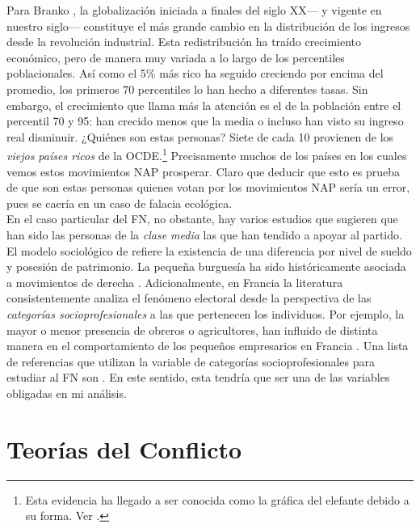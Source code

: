 Para Branko \textcite{Milanovic16}, la globalización iniciada a finales del siglo XX--- y vigente en nuestro siglo--- constituye el más grande cambio en la distribución de los ingresos desde la revolución industrial. Esta redistribución ha traído crecimiento económico, pero de manera muy variada a lo largo de los percentiles poblacionales. Así como el 5\% más rico ha seguido creciendo por encima del promedio, los primeros 70 percentiles lo han hecho a diferentes tasas. Sin embargo, el crecimiento que llama más la atención es el de la población entre el percentil 70 y 95: han crecido menos que la media o incluso han visto su ingreso real disminuir. ¿Quiénes son estas personas? Siete de cada 10 provienen de los \textit{viejos países ricos} de la OCDE.\footnote{Esta evidencia ha llegado a ser conocida como la gráfica del elefante debido a su forma. Ver \textcite{Milanovic16}.} Precisamente muchos de los países en los cuales vemos estos movimientos NAP prosperar. Claro que deducir que esto es prueba de que son estas personas quienes votan por los movimientos NAP sería un error, pues se caería en un caso de falacia ecológica.\\

En el caso particular del FN, no obstante, hay varios estudios que sugieren que han sido las personas de la \textit{clase media} las que han tendido a apoyar al partido. El modelo sociológico de \textcite{MayerPerrineau90} refiere la existencia de una diferencia por nivel de sueldo y posesión de patrimonio. La pequeña burguesía ha sido históricamente asociada a movimientos de derecha \parencites{Mayer87}{LeBras15}{Goodliffe19}. Adicionalmente, en Francia la literatura consistentemente analiza el fenómeno electoral desde la perspectiva de las \textit{categorías socioprofesionales} a las que pertenecen los individuos. Por ejemplo, la mayor o menor presencia de obreros o agricultores, han influido de distinta manera en el comportamiento de los pequeños empresarios en Francia \parencite{MayerMichelat81}. Una lista de referencias que utilizan la variable de categorías socioprofesionales para estudiar al FN son \textcites{Mayer87}{Mayer05}{Mayer07}{MayerPerrineau90}{MayerBoy97}{Perrineau99}{Perrineau07}{Perrineau12}{Gombin05}{Gombin09}{Gombin13}{Gombin13b}{Riviere12}{GombinRiviere13}. En este sentido, esta tendría que ser una de las variables obligadas en mi análisis.

\section{Teorías del Conflicto}

